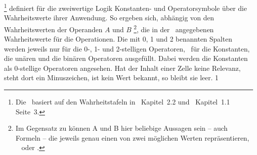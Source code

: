 %
\footnote{%
	Die \tablename\ basiert auf den Wahrheitstafeln in~\cite{bib:Junktor} Kapitel~2.2 und~\cite{bib:Rautenberg} Kapitel~1.1 Seite~3.%
}
definiert für die zweiwertige Logik Konstanten- und Operatorsymbole über die Wahrheitswerte ihrer Anwendung.
So ergeben sich, abhängig von den Wahrheitswerten der Operanden $A$ und $B$%
\footnote{%
	Im Gegensatz zu  können A und B hier beliebige Aussagen sein -- auch Formeln -- die jeweils genau einen von zwei möglichen Werten repräsentieren, \textzB\  oder .%
},
die in der \tablename\ angegebenen Wahrheitswerte für die Operationen.
Die mit 0, 1 und 2 benannten Spalten werden jeweils nur für die 0-, 1- und 2-stelligen Operatoren, \textdh\ für die Konstanten, die unären und die binären Operatoren ausgefüllt.
Dabei werden die Konstanten als 0-stellige Operatoren angesehen.
Hat der Inhalt einer Zelle keine Relevanz, steht dort ein Minuszeichen, ist kein Wert bekannt, so bleibt sie leer.
%
    \setcounter{prio}    {1}
    \setcounter{pnot}    {\value{prio}}
    \setcounter{pand}    {\value{prio}}
   \setcounter{pnand}   {\value{prio}}
   \setcounter{pmult}   {\value{prio}}
     \setcounter{por}     {\value{prio}}
    \setcounter{pnor}    {\value{prio}}
    \setcounter{pxor}    {\value{prio}}
    \setcounter{padd}    {\value{prio}}
    \setcounter{pimp}    {\value{prio}}
   \setcounter{pnimp}   {\value{prio}}
    \setcounter{prep}    {\value{prio}}
   \setcounter{pnrep}   {\value{prio}}
  \setcounter{pequiv}  {\value{prio}}
 \setcounter{pnequiv} {\value{prio}}

